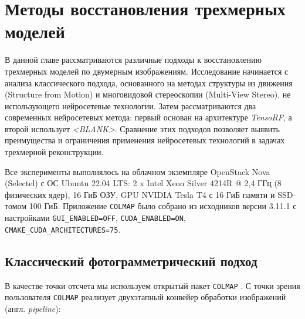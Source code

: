 \chapter{Методы восстановления трехмерных моделей}

В данной главе рассматриваются различные подходы к восстановлению трехмерных
моделей по двумерным изображениям. Исследование начинается с анализа
классического подхода, основанного на методах структуры из движения (Structure
from Motion) и многовидовой стереоскопии (Multi-View Stereo), не использующего
нейросетевые технологии. Затем рассматриваются два современных нейросетевых
метода: первый основан на архитектуре \textit{TensoRF}, а второй использует
\textit{<BLANK>}. Сравнение этих подходов позволяет выявить преимущества и
ограничения применения нейросетевых технологий в задачах трехмерной
реконструкции.

Все эксперименты выполнялось на облачном экземпляре OpenStack Nova (Selectel) с
ОС Ubuntu 22.04 LTS: 2 x Intel Xeon Silver 4214R @ 2,4 ГГц (8 физических ядер),
16 ГиБ ОЗУ, GPU NVIDIA Tesla T4 с 16 ГиБ памяти и SSD-томом 100 ГиБ. Приложение
\texttt{COLMAP} было собрано из исходников версии 3.11.1 с настройками
\texttt{GUI\_ENABLED=OFF}, \texttt{CUDA\_ENABLED=ON},
\texttt{CMAKE\_CUDA\_ARCHITECTURES=75}.

\section{Классический фотограмметрический подход}

В качестве точки отсчета мы используем открытый пакет
\texttt{COLMAP} \cite{10.1109/CVPR.2016.4454}. С точки зрения
пользователя \texttt{COLMAP} реализует двухэтапный конвейер обработки изображений
(англ. \emph{pipeline}):

